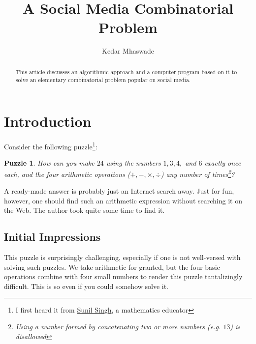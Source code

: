 \documentclass[english,smartquotes]{hgbarticle}
\newtheorem{question}{Puzzle}
\begin{document}

\author{
	Kedar Mhaswade\\ 
}
\title{A Social Media Combinatorial Problem}
\date{}

\maketitle

\begin{abstract}\noindent
This article discusses an algorithmic approach and a computer program based on it
to solve an elementary combinatorial problem popular on social media.
\end{abstract}


\section{Introduction}

Consider the following puzzle\footnote{I first heard it from \href{https://sunilsingh-42118.medium.com/}{Sunil Singh}, a mathematics educator}:

\begin{question}
How can you make $24$ using the numbers $1, 3, 4,$ and $6$ exactly once each, and the four arithmetic operations ($+, -, \times, \div$) any number of times\footnote{Using a number formed by concatenating two or more numbers (e.g. $13$) is disallowed}?
\end{question}

A ready-made answer is probably just an Internet search away. Just for fun, however, one should find such an arithmetic expression without searching it on the Web. The author took quite some time to find it.

\subsection{Initial Impressions}
This puzzle is surprisingly challenging, especially if one is not well-versed with solving such puzzles. We take arithmetic for granted, but the four basic operations combine with four small numbers to render this puzzle tantalizingly difficult. This is so even if you could somehow solve it.
\end{document}
